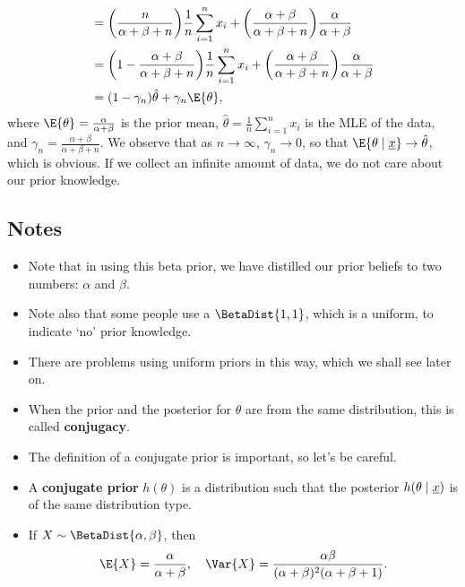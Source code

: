 \begin{itemize}
\begin{framed}
\begin{align*}
                         & =\biggl(\frac{n}{\alpha+\beta+n}\biggr)\frac{1}{n}\sum_{i=1}^{n}x_i+\biggl(\frac{\alpha+\beta}{\alpha+\beta+n}\biggr)\frac{\alpha}{\alpha+\beta}              \\
                         & =\biggl(1-\frac{\alpha+\beta}{\alpha+\beta+n}\biggr)\frac{1}{n}\sum_{i=1}^{n}x_i+\biggl(\frac{\alpha+\beta}{\alpha+\beta+n}\biggr)\frac{\alpha}{\alpha+\beta} \\
                         & =(1-\gamma_n)\hat{\theta}+\gamma_n\E{\theta},
                  \end{align*}
                  where $ \E{\theta}=\frac{\alpha}{\alpha+\beta} $ is the prior mean, $ \hat{\theta}=\frac{1}{n}\sum_{i=1}^{n}x_i $ is the MLE
                  of the data, and $ \gamma_n=\frac{\alpha+\beta}{\alpha+\beta+n} $. We observe that as $ n\to\infty $,
                  $ \gamma_n\to 0 $, so that $ \E{\theta\mid \Vector{x}}\to \hat{\theta} $, which is obvious. If we collect an infinite amount of
                  data, we do not care about our prior knowledge.
            \end{framed}
\end{itemize}
\subsection*{Notes}
\begin{itemize}
      \item Note that in using this beta prior, we have distilled our prior beliefs to
            two numbers: $ \alpha $ and $ \beta $.
      \item Note also that some people use a $ \BetaDist{1,1} $, which is a uniform, to
            indicate `no' prior knowledge.
      \item There are problems using uniform priors in this way, which we shall see
            later on.
      \item When the prior and the posterior for $ \theta $ are from the same distribution,
            this is called \textbf{conjugacy}.
      \item The definition of a conjugate prior is important, so let's be careful.
      \item A \textbf{conjugate prior} $ h(\theta) $ is a distribution such that the posterior
            $ h(\theta\mid \underline{x}) $ is of the same distribution type.
      \item If $ X \sim \BetaDist{\alpha,\beta} $, then
            \[ \E{X}=\frac{\alpha}{\alpha+\beta},\quad \Var{X}=\frac{\alpha\beta}{(\alpha+\beta)^2(\alpha+\beta+1)}. \]
\end{itemize}

